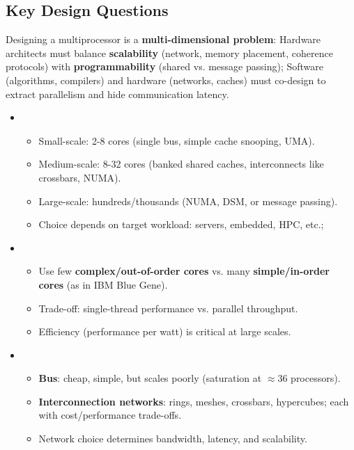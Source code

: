 \subsection{Key Design Questions}

Designing a multiprocessor is a \textbf{multi-dimensional problem}: Hardware architects must balance \textbf{scalability} (network, memory placement, coherence protocols) with \textbf{programmability} (shared vs. message passing); Software (algorithms, compilers) and hardware (networks, caches) must co-design to extract parallelism and hide communication latency.

\begin{itemize}
    \item {}
    \begin{itemize}
        \item Small-scale: 2-8 cores (single bus, simple cache snooping, UMA).
        \item Medium-scale: 8-32 cores (banked shared caches, interconnects like crossbars, NUMA).
        \item Large-scale: hundreds/thousands (NUMA, DSM, or message passing).
        \item Choice depends on target workload: servers, embedded, HPC, etc.;
    \end{itemize}
    \item {}
    \begin{itemize}
        \item Use few \textbf{complex/out-of-order cores} vs. many \textbf{simple/in-order cores} (as in IBM Blue Gene).
        \item Trade-off: single-thread performance vs. parallel throughput.
        \item Efficiency (performance per watt) is critical at large scales.
    \end{itemize}
    \item {}
    \begin{itemize}
        \item \textbf{Bus}: cheap, simple, but scales poorly (saturation at $\approx 36$ processors).
        \item \textbf{Interconnection networks}: rings, meshes, crossbars, hypercubes; each with cost/performance trade-offs.
        \item Network choice determines bandwidth, latency, and scalability.
    \end{itemize}

\end{itemize}
